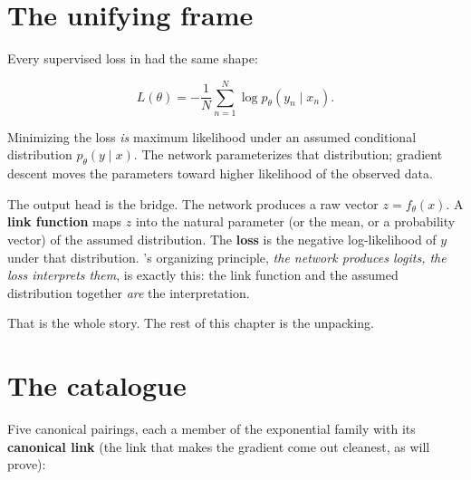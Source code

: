 
\section{The unifying frame}\label{sec:mle-frame}

Every supervised loss in  had the same shape:

\[
  L(\theta) = -\frac{1}{N} \sum_{n=1}^{N} \log p_\theta(y_n \mid x_n).
\]

Minimizing the loss \emph{is} maximum likelihood under an assumed
conditional distribution $p_\theta(y \mid x)$. The network parameterizes
that distribution; gradient descent moves the parameters toward higher
likelihood of the observed data.

The output head is the bridge. The network produces a raw vector
$z = f_\theta(x)$. A \textbf{link function} maps $z$ into the natural
parameter (or the mean, or a probability vector) of the assumed
distribution. The \textbf{loss} is the negative log-likelihood of $y$
under that distribution. 's organizing principle,
\emph{the network produces logits, the loss interprets them}, is exactly
this: the link function and the assumed distribution together \emph{are}
the interpretation.

That is the whole story. The rest of this chapter is the unpacking.

\section{The catalogue}\label{sec:catalogue}

Five canonical pairings, each a member of the exponential family with its
\textbf{canonical link} (the link that makes the gradient come out
cleanest, as  will prove):

